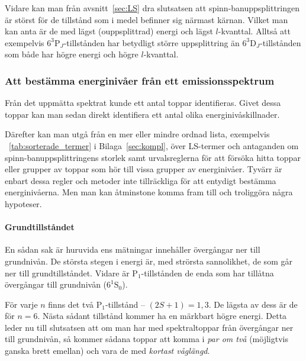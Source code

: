 \documentclass[11pt,a4paper]{article}
\newcommand{\tabref}{\tablename~\ref} %
\begin{document}
Vidare kan man från avsnitt~\ref{sec:LS} dra slutsatsen att
spinn-banuppsplittringen är störst för de tillstånd som i medel
befinner sig närmast kärnan. Vilket man kan anta är de med lägst
(ouppsplittrad) energi och lägst $l$-kvanttal.\footnotemark{} Alltså
att exempelvis $6^3\mathrm{P}_J$-tillstånden har betydligt större
uppsplittring än $6^3\mathrm{D}_J$-tillstånden som både har högre
energi och högre $l$-kvanttal.  


\subsubsection{Att bestämma energinivåer från ett emissionsspektrum}
\label{sec:teori_nivaer}
Från det uppmätta spektrat kunde ett antal toppar identifieras. Givet
dessa toppar kan man sedan direkt identifiera ett antal olika
energinivåskillnader. 

Därefter kan man utgå från en mer eller mindre ordnad lista,
exempelvis \tabref{tab:sorterade_termer} i Bilaga~\ref{sec:kompl},
över LS-termer och antaganden om spinn-banuppsplittringens storlek
samt urvalsreglerna för att försöka hitta toppar eller grupper av
toppar som hör till vissa grupper av energinivåer. 
Tyvärr är enbart dessa regler och metoder inte tillräckliga för att
entydigt bestämma energinivåerna. Men man kan åtminstone komma fram
till och troliggöra några hypoteser. 

\paragraph{Grundtillståndet}
En sådan sak är huruvida ens mätningar innehåller övergångar ner till
grundnivån. De största stegen i energi är, med strörsta sannolikhet,
de som går ner till grundtillståndet. Vidare är
$\mathrm{P}_1$-tillstånden de enda som har tillåtna övergångar till
grundnivån ($6^1\mathrm{S}_0$).

För varje $n$ finns det två $\mathrm{P}_1$-tillstånd -- 
$(2S +1) = 1, 3$. De lägsta av dess är de för $n=6$. Nästa sådant
tillstånd kommer ha en märkbart högre energi. Detta leder nu till
slutsatsen att om man har med spektraltoppar från övergångar ner till
grundnivån, så kommer sådana toppar att komma i \emph{par om två}
(möjligtvis ganska brett emellan) och vara de med \emph{kortast
  våglängd}. 
\end{document}
